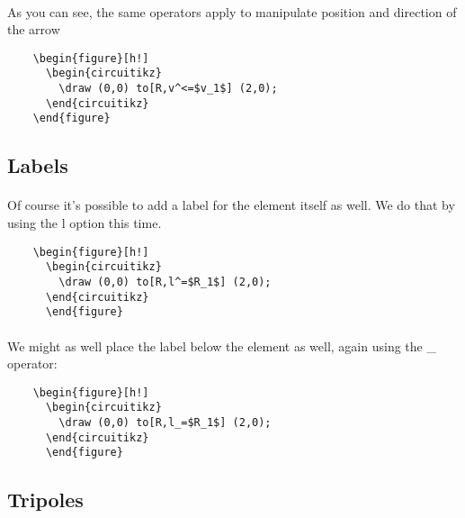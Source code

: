   \paragraph{}
  As you can see, the same operators apply to manipulate position and direction of the arrow
  \begin{lstlisting}
    \begin{figure}[h!]
      \begin{circuitikz}
        \draw (0,0) to[R,v^<=$v_1$] (2,0);
      \end{circuitikz}
    \end{figure}
  \end{lstlisting} 

  \subsection{Labels}
  \paragraph{}
  Of course it's possible to add a label for the element itself as well. We do that by using the l option this time.
  \begin{lstlisting}
    \begin{figure}[h!]
      \begin{circuitikz}
        \draw (0,0) to[R,l^=$R_1$] (2,0);
      \end{circuitikz}
      \end{figure}
  \end{lstlisting} 
  \paragraph{}
  We might as well place the label below the element as well, again using the \_ operator:
  \begin{lstlisting}
    \begin{figure}[h!]
      \begin{circuitikz}
        \draw (0,0) to[R,l_=$R_1$] (2,0);
      \end{circuitikz}
      \end{figure}
  \end{lstlisting} 

  \subsection{Tripoles}
